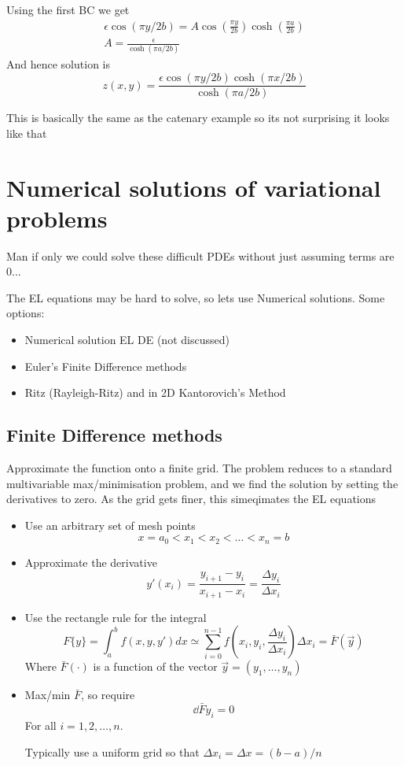 \documentclass{E:/Documents/Latex/myassignment}
\begin{document}
Using the first BC we get
\begin{align*}
\epsilon \cos \left(\pi y/2b\right) = A \cos\left(\frac{\pi y}{2b}\right) \cosh\left(\frac{\pi a}{2b}\right)\\
A = \frac{\epsilon}{\cosh\left(\pi a /2b\right)}	
\end{align*}
And hence solution is
\[z(x,y) = \frac{\epsilon \cos(\pi y/2b) \cosh(\pi x/2b)}{\cosh\left(\pi a /2b\right)} \]


This is basically the same as the catenary example so its not surprising it looks like that

\section{Numerical solutions of variational problems}
Man if only we could solve these difficult PDEs without just assuming terms are 0...

The EL equations may be hard to solve, so lets use Numerical solutions.
Some options:
\begin{itemize}
	\item Numerical solution EL DE (not discussed)
	\item Euler's Finite Difference methods
	\item Ritz (Rayleigh-Ritz) and in 2D Kantorovich's Method
\end{itemize}

\subsection{Finite Difference methods}
Approximate the function onto a finite grid. The problem reduces to a standard multivariable max/minimisation problem, and we find the solution by setting the derivatives to zero. As the grid gets finer, this simeqimates the EL equations
\begin{itemize}
	\item Use an arbitrary set of mesh points
	\[x = a_0 < x_1 < x_2 <\ldots <x_n = b\]
	\item Approximate the derivative
	\[y'(x_i) = \frac{y_{i+1} - y_i}{x_{i+1} - x_i} = \frac{\Delta y_i}{\Delta x_i}\]
	\item Use the rectangle rule for the integral
	\[F\{y\} = \int_a^b f(x,y,y') dx \simeq \sum_{i=0}^{n-1} f\left(x_i,y_i,\frac{\Delta y_i}{\Delta x_i}\right) \Delta x_i = \bar{F}(\vec y)\]
	Where $\bar{F}(\cdot)$ is a function of the vector $\vec y = \left(y_1,\ldots,y_n\right)$
	\item Max/min $\bar{F}$, so require
	\[\dd{\bar{F}}{y_i} = 0\]
	For all $i=1,2,\ldots,n$.

	Typically use a uniform grid so that $\Delta x_i = \Delta x = (b-a)/n$
\end{itemize}
\end{document}
